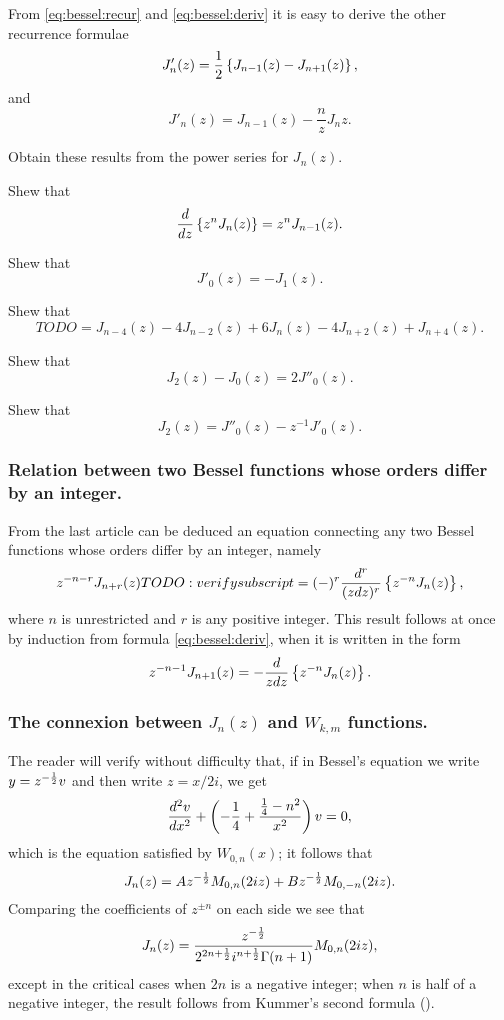 \documentclass{book}
\begin{document}
From \eqref{eq:bessel:recur} and \eqref{eq:bessel:deriv} it is easy to
derive the other recurrence formulae
\begin{equation}
  J'_{n}(z) = \frac{1}{2} \left\{  J_{n-1}(z) - J_{n+1}(z)   \right\},
\end{equation}
and
\begin{equation}
  J'_{n}(z) = J_{n-1}(z) - \frac{n}{z} J_n{z}.
\end{equation}
\begin{wandwexample}
  Obtain these results from the power series for $J_n(z)$.
\end{wandwexample}
\begin{wandwexample}
  Shew that 
  $$
  \frac{d}{dz} \left\{  z^n J_n(z)  \right\} = z^n J_{n-1}(z).
  $$
\end{wandwexample}
\begin{wandwexample}
  Shew that
  $$
  J'_0(z) = -J_1(z).
  $$
\end{wandwexample}
\begin{wandwexample}
  Shew that
  $$
  TODO = J_{n-4}(z) - 4 J_{n-2}(z) + 6 J_n(z) - 4 J_{n+2}(z) + J_{n+4}(z).
  $$
\end{wandwexample}
\begin{wandwexample}
  Shew that
  $$
  J_2(z) - J_0(z) = 2 J''_0(z).
  $$
\end{wandwexample}
\begin{wandwexample}
  Shew that
  $$
  J_2(z) = J''_0(z) - z^{-1} J'_0(z).
  $$
\end{wandwexample}

\subsubsection{Relation between two Bessel functions whose orders
  differ by an integer.}
From the last article can be deduced an equation connecting any two
Bessel functions whose orders differ by an integer, namely
$$
z^{-n-r} J_{n+r}(z) TODO: verify subscript
=
(-)^r
\frac{d^r}{ (z dz)^r }
\left\{  z^{-n} J_n(z)   \right\},
$$
where $n$ is unrestricted and $r$ is any positive integer. This result
follows at once by induction from formula \eqref{eq:bessel:deriv},
when it is written in the form
$$
z^{-n-1} J_{n+1}(z) 
=
- \frac{d}{z dz}
\left\{  z^{-n} J_n(z)   \right\}.
$$
\subsubsection{The connexion between $J_n(z)$ and $W_{k,m}$
  functions.}
The reader will verify without difficulty that, if in Bessel's
equation we write $y = z^{-\frac{1}{2}} v$ and then write $z = x/2i$, we get
$$
\frac{d^2 v}{dx^2}
+
\left(  -\frac{1}{4} + \frac{\frac{1}{4} - n^2}{x^2}   \right) v
=
0,
$$
which is the equation satisfied by $W_{0,n}(x)$; it follows that
$$
J_n(z) = A z^{-\frac{1}{2}} M_{0,n}(2iz) + B z^{-\frac{1}{2}} M_{0,-n}(2iz).
$$
Comparing the coefficients of $z^{\pm n}$ on each side we see that
$$
J_n(z) = \frac{z^{-\frac{1}{2}}}{2^{2n+\frac{1}{2}} i^{n+\frac{1}{2}} \Gamma(n+1)} M_{0,n}(2iz),
$$
%
%
except in the critical cases when $2n$ is a negative integer; 
when $n$ is half of a negative integer, the result follows from
Kummer's second formula ().
\end{document}
